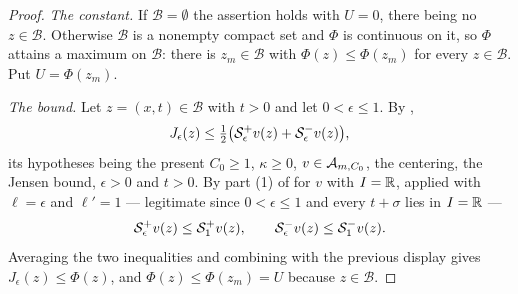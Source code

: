 \begin{proof}
\emph{The constant.} If $\mathcal B=\emptyset$ the assertion holds with $U=0$,
there being no $z\in\mathcal B$. Otherwise $\mathcal B$ is a nonempty compact
set and $\Phi$ is continuous on it, so $\Phi$ attains a maximum on $\mathcal B$:
there is $z_m\in\mathcal B$ with $\Phi(z)\le\Phi(z_m)$ for every
$z\in\mathcal B$. Put $U=\Phi(z_m)$.

\emph{The bound.} Let $z=(x,t)\in\mathcal B$ with $t>0$ and let
$0<\epsilon\le1$. By ,
\[
  J_\epsilon(z)\le\tfrac12\bigl(\mathcal{S}^+_\epsilon v(z)+\mathcal{S}^-_\epsilon v(z)\bigr),
\]
its hypotheses being the present $C_0\ge1$, $\kappa\ge0$, $v\in\mathcal{A}_{m,C_0}$,
the centering, the Jensen bound, $\epsilon>0$ and $t>0$. By part (1) of
 for $v$ with $I=\mathbb{R}$, applied with
$\ell=\epsilon$ and $\ell'=1$ --- legitimate since $0<\epsilon\le1$ and every
$t+\sigma$ lies in $I=\mathbb{R}$ ---
\[
  \mathcal{S}^+_\epsilon v(z)\le\mathcal{S}^+_1v(z),\qquad
  \mathcal{S}^-_\epsilon v(z)\le\mathcal{S}^-_1v(z).
\]
Averaging the two inequalities and combining with the previous display gives
$J_\epsilon(z)\le\Phi(z)$, and $\Phi(z)\le\Phi(z_m)=U$ because
$z\in\mathcal B$. \end{proof}
